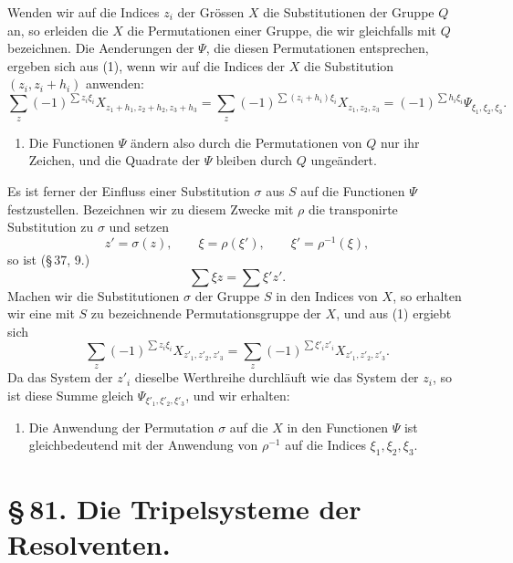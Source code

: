 \documentclass[11pt]{article}
\begin{document}
Wenden wir auf die Indices $z_i$ der Grössen $X$ die Substitutionen der Gruppe $Q$ an, so erleiden die $X$ die Permutationen einer Gruppe, die wir gleichfalls mit $Q$ bezeichnen. Die Aenderungen der $\Psi$, die diesen Permutationen entsprechen, ergeben sich aus (1), wenn wir auf die Indices der $X$ die Substitution $(z_i,z_i+h_i)$ anwenden:
\begin{equation}
 \sum_z (-1)^{\sum z_i\xi_i}X_{z_1+h_1,z_2+h_2,z_3+h_3}
 =\sum_z (-1)^{\sum (z_i+h_i)\xi_i}X_{z_1,z_2,z_3}
 =(-1)^{\sum h_i\xi_i}\Psi_{\xi_1,\xi_2,\xi_3}.
 \tag{2}
\end{equation}

\begin{enumerate}[label=\arabic*.,leftmargin=2.8em]
\item Die Functionen $\Psi$ ändern also durch die Permutationen von $Q$ nur ihr Zeichen, und die Quadrate der $\Psi$ bleiben durch $Q$ ungeändert.
\end{enumerate}

Es ist ferner der Einfluss einer Substitution $\sigma$ aus $S$ auf die Functionen $\Psi$ festzustellen. Bezeichnen wir zu diesem Zwecke mit $\rho$ die transponirte Substitution zu $\sigma$ und setzen
\begin{equation}
 z'=\sigma(z),\qquad \xi=\rho(\xi'),\qquad \xi'=\rho^{-1}(\xi),
 \tag{3}
\end{equation}
so ist (\S\,37, 9.)
\begin{equation}
 \sum \xi z=\sum \xi' z'.
 \tag{4}
\end{equation}
Machen wir die Substitutionen $\sigma$ der Gruppe $S$ in den Indices von $X$, so erhalten wir eine mit $S$ zu bezeichnende Permutationsgruppe der $X$, und aus (1) ergiebt sich
\[
 \sum_z(-1)^{\sum z_i\xi_i}X_{z'_1,z'_2,z'_3}
 =\sum_z(-1)^{\sum \xi'_i z'_i}X_{z'_1,z'_2,z'_3}.
\]
Da das System der $z'_i$ dieselbe Werthreihe durchläuft wie das System der $z_i$, so ist diese Summe gleich $\Psi_{\xi'_1,\xi'_2,\xi'_3}$, und wir erhalten:
\begin{enumerate}[label=\arabic*.,leftmargin=2.8em,start=2]
\item Die Anwendung der Permutation $\sigma$ auf die $X$ in den Functionen $\Psi$ ist gleichbedeutend mit der Anwendung von $\rho^{-1}$ auf die Indices $\xi_1,\xi_2,\xi_3$.
\end{enumerate}

\section*{\S\,81. Die Tripelsysteme der Resolventen.}
\end{document}
